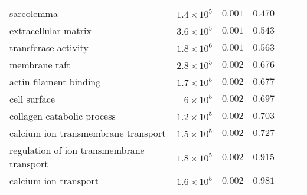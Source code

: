 \begin{longtable*}{|l|r|r|r|r|r|}
    sarcolemma                                & $1.4\times 10^{5}$ & $ 0.001$             & $ 0.470~~$                      \\
    extracellular matrix                      & $3.6\times 10^{5}$ & $ 0.001$             & $ 0.543~~$                      \\
    transferase activity                      & $1.8\times 10^{6}$ & $ 0.001$             & $ 0.563~~$                      \\
    membrane raft                             & $2.8\times 10^{5}$ & $ 0.002$             & $ 0.676~~$                      \\
    actin filament binding                    & $1.7\times 10^{5}$ & $ 0.002$             & $ 0.677~~$                      \\
    cell surface                              & $ 6\times 10^{5}$  & $ 0.002$             & $ 0.697~~$                      \\
    collagen catabolic process                & $1.2\times 10^{5}$ & $ 0.002$             & $ 0.703~~$                      \\
    calcium ion transmembrane transport       & $1.5\times 10^{5}$ & $ 0.002$             & $ 0.727~~$                      \\
    regulation of ion transmembrane transport & $1.8\times 10^{5}$ & $ 0.002$             & $ 0.915~~$                      \\
    calcium ion transport                     & $1.6\times 10^{5}$ & $ 0.002$             & $ 0.981~~$                      \\
\end{longtable*}
